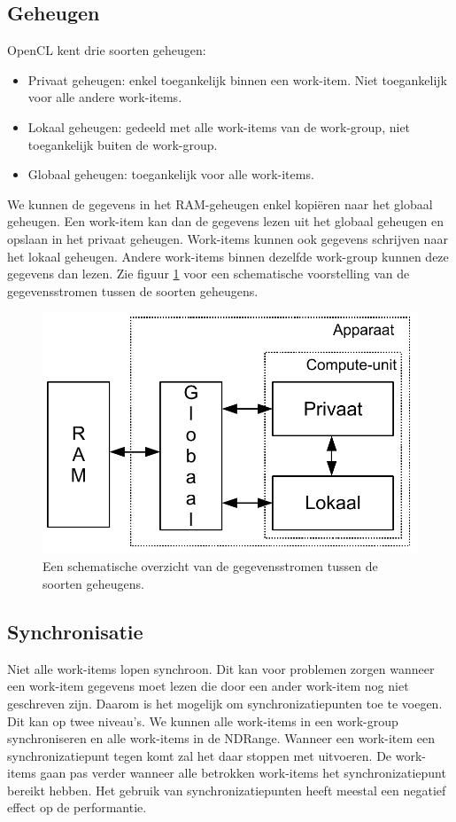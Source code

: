 \subsection{Geheugen}
\label{h:opencl:geheugen}
OpenCL kent drie soorten geheugen:
\begin{itemize}
    \item Privaat geheugen: enkel toegankelijk binnen een work-item. Niet toegankelijk voor alle andere work-items.
    \item Lokaal geheugen: gedeeld met alle work-items van de work-group, niet toegankelijk buiten de work-group.
    \item Globaal geheugen: toegankelijk voor alle work-items.
\end{itemize}

We kunnen de gegevens in het RAM-geheugen enkel kopi\"eren naar het globaal geheugen. Een work-item kan dan de gegevens lezen uit het globaal geheugen en opslaan in het privaat geheugen. Work-items kunnen ook gegevens schrijven naar het lokaal geheugen.
Andere work-items binnen dezelfde work-group kunnen deze gegevens dan lezen. Zie figuur \ref{geheugenCL} voor een schematische voorstelling van de gegevensstromen tussen de soorten geheugens.

\begin{figure}[]
\centering
\includegraphics[scale=0.5]{geheugenCL}
\caption{\label{geheugenCL}Een schematische overzicht van de gegevensstromen tussen de soorten geheugens.}
\end{figure}

\subsection{Synchronisatie}
Niet alle work-items lopen synchroon. Dit kan voor problemen zorgen wanneer een work-item gegevens moet lezen die door een ander work-item nog niet geschreven zijn. Daarom is het mogelijk om synchronizatiepunten toe te voegen. Dit kan op twee niveau's. We kunnen alle work-items in een work-group synchroniseren en alle work-items in de NDRange. Wanneer een work-item een synchronizatiepunt tegen komt zal het daar stoppen met uitvoeren. De work-items gaan pas verder wanneer alle betrokken work-items het synchronizatiepunt bereikt hebben. Het gebruik van synchronizatiepunten heeft meestal een negatief effect op de performantie.

